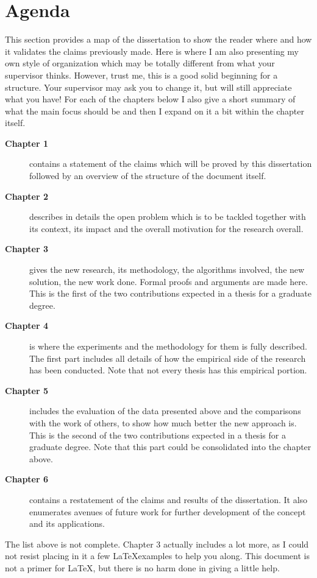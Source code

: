\section{Agenda}

This section provides a map of the dissertation
to show the reader where and how it validates
the claims previously made. Here is where I am also presenting my own style of organization which may be totally different from what your supervisor thinks. However, trust me, this is a good solid beginning for a structure. Your supervisor may ask you to change it, but will still appreciate what you have! For each of the chapters below I also give a short summary of what the main focus should be and then I expand on it  a bit within the chapter itself.

\begin{description}
\item[\textbf{Chapter 1}] contains a statement of
the claims which will be proved by this dissertation followed by an overview of the structure of the document itself.
\item[\textbf{Chapter 2}] describes in details the open problem which is to be tackled together with its context, its impact and the overall motivation for the research overall.
\item[\textbf{Chapter 3}] gives the new research, its methodology, the algorithms involved, the new solution, the new work done. Formal proofs and arguments are made here. This is the first of the two contributions expected in a thesis for a graduate degree.
\item[\textbf{Chapter 4}] is where the experiments and the methodology for them is fully described. The first part includes all details of how the empirical side of the research has been conducted. Note that not every thesis has this empirical portion.
\item[\textbf{Chapter 5}] includes the evaluation of the data presented above and the comparisons with the work of others, to show how much better the new approach is. This is the second of the two contributions expected in a thesis for a graduate degree. Note that this part could be consolidated into the chapter above.
\item[\textbf{Chapter 6}] contains a restatement of the claims and results of the dissertation. It also enumerates avenues of future work for further development of the concept and its applications.
\end{description}

The list above is not complete. Chapter 3 actually includes a lot more, as I could not resist placing in it a few \LaTeX examples to help you along. This document is not a primer for \LaTeX, but there is no harm done in giving a little help.
